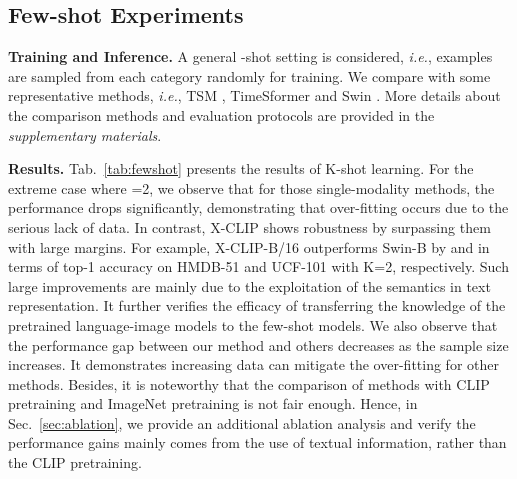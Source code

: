 \documentclass[runningheads]{llncs}
\begin{document}
\subsection{Few-shot Experiments} \label{sec:few-shot}

\textbf{Training and Inference.} A general -shot setting is considered, \emph{i.e.},  examples are sampled from each category randomly for training. We compare with some representative methods, \emph{i.e.}, TSM \cite{lin2019tsm}, TimeSformer \cite{timesformer2021} and Swin \cite{liu2021video}. More details about the comparison methods and evaluation protocols are provided in the \emph{supplementary materials}.

\textbf{Results.} Tab.~\ref{tab:fewshot} presents the results of K-shot learning. For the extreme case where =2, we observe that for those single-modality methods, the performance drops significantly, demonstrating that over-fitting occurs due to the serious lack of data. In contrast, X-CLIP shows robustness by surpassing them with large margins. For example, X-CLIP-B/16 outperforms Swin-B by  and  in terms of top-1 accuracy on HMDB-51 and UCF-101 with K=2, respectively. Such large improvements are mainly due to the exploitation of the semantics in text representation. It further verifies the efficacy of transferring the knowledge of the pretrained language-image models to the few-shot models. We also observe that the performance gap between our method and others decreases as the sample size increases. It demonstrates increasing data can mitigate the over-fitting for other methods. Besides, it is noteworthy that the comparison of methods with CLIP pretraining and ImageNet pretraining is not fair enough. Hence, in Sec.~\ref{sec:ablation}, we provide an additional ablation analysis and verify the performance gains mainly comes from the use of textual information, rather than the CLIP pretraining. 
\end{document}
